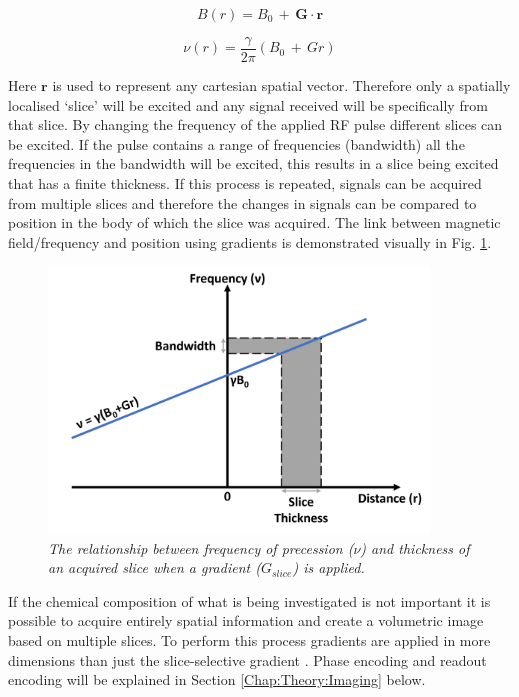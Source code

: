 \begin{equation}
    B(r) = B_0 \, + \, \mathbf{G} \cdot \mathbf{r}
    \label{eqn:theory:B_Grad}
\end{equation}

\begin{equation}
    \nu(r) = \frac{\gamma}{2\pi}(B_0 \, + \, Gr)
    \label{eqn:theory:f_Grad}
\end{equation}

\noindent Here $\mathbf{r}$ is used to represent any cartesian spatial vector. Therefore only a spatially localised `slice' will be excited and any signal received will be specifically from that slice. By changing the frequency of the applied \ac{RF} pulse different slices can be excited. If the pulse contains a range of frequencies (bandwidth) all the frequencies in the bandwidth will be excited, this results in a slice being excited that has a finite thickness. If this process is repeated, signals can be acquired from multiple slices and therefore the changes in signals can be compared to position in the body of which the slice was acquired. The link between magnetic field/frequency and position using gradients is demonstrated visually in Fig. \ref{fig:theory:Grad}.

\begin{figure}
    \centering
    \includegraphics[width=0.9\textwidth]{Figures/Theory/Gradient.png}
    \caption{\textit{The relationship between frequency of precession ($\nu$) and thickness of an acquired slice when a gradient ($G_{slice}$) is applied.}}
    \label{fig:theory:Grad}
\end{figure}

If the chemical composition of what is being investigated is not important it is possible to acquire entirely spatial information and create a volumetric image based on multiple slices. To perform this process gradients are applied in more dimensions than just the slice-selective gradient \cite{deGraaf2019InSpectroscopy}. Phase encoding and readout encoding will be explained in Section \ref{Chap:Theory:Imaging} below.

